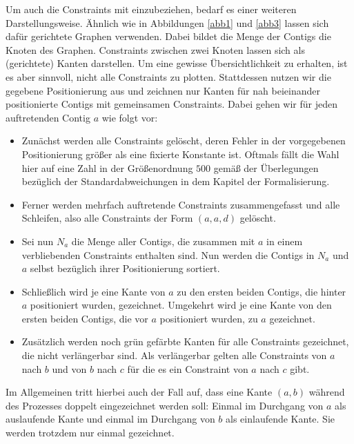 Um auch die Constraints mit einzubeziehen, bedarf es einer weiteren Darstellungsweise.
Ähnlich wie in Abbildungen \ref{abb1} und \ref{abb3} lassen sich dafür gerichtete Graphen verwenden. Dabei bildet die Menge der Contigs die Knoten des Graphen. Constraints zwischen zwei Knoten lassen sich als (gerichtete) Kanten darstellen.
Um eine gewisse Übersichtlichkeit zu erhalten, ist es aber sinnvoll, nicht alle Constraints zu plotten.
Stattdessen nutzen wir die gegebene Positionierung aus und zeichnen nur Kanten für nah beieinander positionierte Contigs mit gemeinsamen Constraints. %
Dabei gehen wir für jeden auftretenden Contig $a$ wie folgt vor:
\begin{itemize}
\item Zunächst werden alle Constraints gelöscht, deren Fehler in der vorgegebenen Positionierung größer als eine fixierte Konstante ist. Oftmals fällt die Wahl hier auf eine Zahl in der Größenordnung $500$ gemäß der Überlegungen bezüglich der Standardabweichungen in dem Kapitel der Formalisierung.
\item Ferner werden mehrfach auftretende Constraints zusammengefasst und alle Schleifen, also alle Constraints der Form $(a, a, d)$ gelöscht.
\item Sei nun $N_a$ die Menge aller Contigs, die zusammen mit $a$ in einem verbliebenden Constraints enthalten sind. Nun werden die Contigs in $N_a$ und $a$ selbst bezüglich ihrer Positionierung sortiert.
\item Schließlich wird je eine Kante von $a$ zu den ersten beiden Contigs, die hinter $a$ positioniert wurden, gezeichnet. Umgekehrt wird je eine Kante von den ersten beiden Contigs, die vor $a$ positioniert wurden, zu $a$ gezeichnet.
\item Zusätzlich werden noch grün gefärbte Kanten 
für alle Constraints gezeichnet, die nicht verlängerbar sind. Als verlängerbar gelten alle Constraints von $a$ nach $b$ und von $b$ nach $c$ für die es ein Constraint von $a$ nach $c$ gibt.
\end{itemize}
Im Allgemeinen tritt hierbei auch der Fall auf, dass eine Kante $(a,b)$ während des Prozesses doppelt eingezeichnet werden soll: Einmal im Durchgang von $a$ als auslaufende Kante und einmal im Durchgang von $b$ als einlaufende Kante.
Sie werden trotzdem nur einmal gezeichnet.

